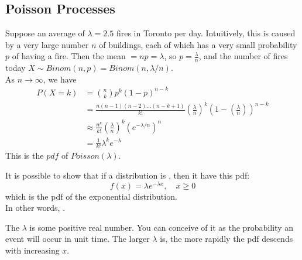 \documentclass[11pt]{article}
\begin{document}
   	\subsection{Poisson Processes}
   	\example
   	Suppose an average of $\lambda = 2.5$ fires in Toronto per day. Intuitively, this is caused by a very large number $n$ of buildings, each of which has a very small probability $p$ of having a fire. Then the mean $= np = \lambda$, so $p = \frac{\lambda}{n}$, and the number of fires today $X \sim Binom(n,p) = Binom(n, \lambda/n)$.\\
   	As $n \rightarrow \infty$, we have
   	\begin{align*}
   		P(X = k) &= {n \choose k}p^k(1-p)^{n-k} \\
   		&= \frac{n(n-1)(n-2)\hdots(n-k+1)}{k!}\left(\frac{\lambda}{n}\right)^k\left(1-\left(\frac{\lambda}{n}\right)\right)^{n-k}\\
   		&\approx \frac{n^k}{k!}\left(\frac{\lambda}{n}\right)^k \left(e^{-\lambda/n}\right)^n\\
   		&= \frac{1}{k!}\lambda^k e^{-\lambda}
   	\end{align*}
   	This is the $pdf$ of $Poisson(\lambda)$.
   	
   	\property
   	It is possible to show that if a distribution is , then it  have this pdf:
   	$$f(x) = \lambda e^{-\lambda x}, \quad x \geq 0$$
   	which is the pdf of the exponential distribution.\\
   	In other words, .
   	
   	\remark
   	The  $\lambda$ is some positive real number. You can conceive of it as the probability an event will occur in unit time. The larger $\lambda$ is, the more rapidly the pdf descends with increasing $x$.
   	
\end{document}
